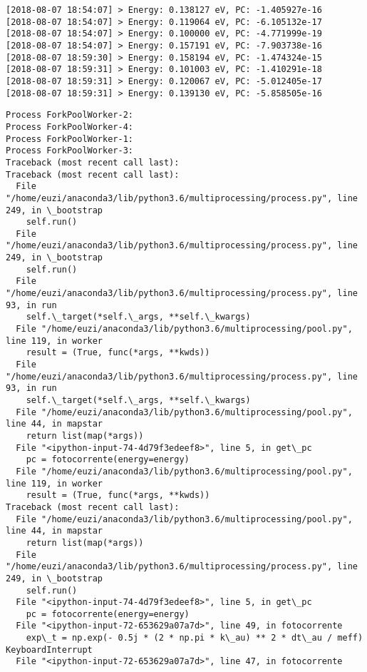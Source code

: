 \documentclass[11pt]{article}
\begin{document}
    \begin{Verbatim}[commandchars=\\\{\}]
[2018-08-07 18:54:07] > Energy: 0.138127 eV, PC: -1.405927e-16 
[2018-08-07 18:54:07] > Energy: 0.119064 eV, PC: -6.105132e-17 
[2018-08-07 18:54:07] > Energy: 0.100000 eV, PC: -4.771999e-19 
[2018-08-07 18:54:07] > Energy: 0.157191 eV, PC: -7.903738e-16 
[2018-08-07 18:59:30] > Energy: 0.158194 eV, PC: -1.474324e-15 
[2018-08-07 18:59:31] > Energy: 0.101003 eV, PC: -1.410291e-18 
[2018-08-07 18:59:31] > Energy: 0.120067 eV, PC: -5.012405e-17 
[2018-08-07 18:59:31] > Energy: 0.139130 eV, PC: -5.858505e-16 

    \end{Verbatim}

    \begin{Verbatim}[commandchars=\\\{\}]
Process ForkPoolWorker-2:
Process ForkPoolWorker-4:
Process ForkPoolWorker-1:
Process ForkPoolWorker-3:
Traceback (most recent call last):
Traceback (most recent call last):
  File "/home/euzi/anaconda3/lib/python3.6/multiprocessing/process.py", line 249, in \_bootstrap
    self.run()
  File "/home/euzi/anaconda3/lib/python3.6/multiprocessing/process.py", line 249, in \_bootstrap
    self.run()
  File "/home/euzi/anaconda3/lib/python3.6/multiprocessing/process.py", line 93, in run
    self.\_target(*self.\_args, **self.\_kwargs)
  File "/home/euzi/anaconda3/lib/python3.6/multiprocessing/pool.py", line 119, in worker
    result = (True, func(*args, **kwds))
  File "/home/euzi/anaconda3/lib/python3.6/multiprocessing/process.py", line 93, in run
    self.\_target(*self.\_args, **self.\_kwargs)
  File "/home/euzi/anaconda3/lib/python3.6/multiprocessing/pool.py", line 44, in mapstar
    return list(map(*args))
  File "<ipython-input-74-4d79f3edeef8>", line 5, in get\_pc
    pc = fotocorrente(energy=energy)
  File "/home/euzi/anaconda3/lib/python3.6/multiprocessing/pool.py", line 119, in worker
    result = (True, func(*args, **kwds))
Traceback (most recent call last):
  File "/home/euzi/anaconda3/lib/python3.6/multiprocessing/pool.py", line 44, in mapstar
    return list(map(*args))
  File "/home/euzi/anaconda3/lib/python3.6/multiprocessing/process.py", line 249, in \_bootstrap
    self.run()
  File "<ipython-input-74-4d79f3edeef8>", line 5, in get\_pc
    pc = fotocorrente(energy=energy)
  File "<ipython-input-72-653629a07a7d>", line 49, in fotocorrente
    exp\_t = np.exp(- 0.5j * (2 * np.pi * k\_au) ** 2 * dt\_au / meff)
KeyboardInterrupt
  File "<ipython-input-72-653629a07a7d>", line 47, in fotocorrente

\end{Verbatim}
\end{document}
